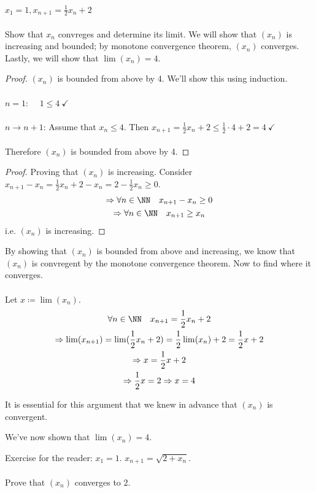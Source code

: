 \documentclass[class=scrartcl, crop=false]{standalone}
\begin{document}
\begin{example}
  $x_1 = 1, x_{n + 1} = \frac{1}{2}x_n + 2$ 
  \\\\
  Show that $x_n$ convreges and determine its limit. We will show that $(x_n)$ is increasing and bounded; by monotone convergence theorem, $(x_n)$ converges. Lastly, we will show that $\lim(x_n) = 4$.
  \begin{proof}
    $(x_n)$ is bounded from above by 4. We'll show this using induction.
    \\\\
    \ul{$n = 1$}: $\quad 1 \leq 4 \ \checkmark$ 
    \\\\
    \ul{$n \to n + 1$}: Assume that $x_n \leq 4$. Then $x_{n + 1} = \frac{1}{2}x_n + 2 \leq \frac{1}{2}\cdot 4 + 2 = 4 \ \checkmark$ 
    \\\\
    Therefore $(x_n)$ is bounded from above by 4.
  \end{proof}
  \begin{proof}
    Proving that $(x_n)$ is increasing. Consider $x_{n + 1} - x_n = \frac{1}{2} x_n + 2 - x_n = 2 - \frac{1}{2}x_n \geq 0$.
    \begin{gather*}
      \Rightarrow \forall n \in \NN \quad x_{n + 1} - x_n \geq 0 \\
      \Rightarrow \forall n \in \NN \quad x_{n + 1} \geq x_n \\
    \end{gather*}
    i.e. $(x_n)$ is increasing.
  \end{proof}  \noindent
  By showing that $(x_n)$ is bounded from above and increasing, we know that $(x_n)$ is convregent by the monotone convergence theorem. Now to find where it converges.
  \\\\
  Let $x \coloneqq \lim(x_n)$.
  \begin{gather*}
    \forall n \in \NN \quad x_{n + 1} = \frac{1}{2}x_n + 2 \\
    \Rightarrow \lim(x_{n + 1}) = \lim(\frac{1}{2}x_n + 2) = \frac{1}{2} \lim(x_n) + 2 = \frac{1}{2} x + 2 \\
    \Rightarrow x = \frac{1}{2}x + 2 \\
    \Rightarrow \frac{1}{2}x = 2 \Rightarrow
    x = 4
  \end{gather*}
  \begin{note}
    It is essential for this argument that we knew in advance that $(x_n)$ is convergent.
  \end{note} \noindent
  We've now shown that $\lim(x_n) = 4$.
\end{example}
\begin{example}
  Exercise for the reader: $x_1 = 1$. $x_{n + 1} = \sqrt{2 + x_n}$.
  \\\\
  Prove that $(x_n)$ converges to 2.
\end{example}
\end{document}
